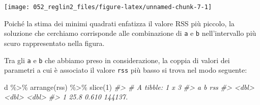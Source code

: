 \documentclass[
  10pt,
  italian,
  a4paper,
  extrafontsizes,onecolumn,openright
  ]{memoir}
\newenvironment{Shaded}{\begin{snugshade}}{\end{snugshade}}
\newcommand{\AttributeTok}[1]{\textcolor[rgb]{0.77,0.63,0.00}{#1}}
\newcommand{\CommentTok}[1]{\textcolor[rgb]{0.56,0.35,0.01}{\textit{#1}}}
\newcommand{\DecValTok}[1]{\textcolor[rgb]{0.00,0.00,0.81}{#1}}
\newcommand{\FloatTok}[1]{\textcolor[rgb]{0.00,0.00,0.81}{#1}}
\newcommand{\FunctionTok}[1]{\textcolor[rgb]{0.00,0.00,0.00}{#1}}
\newcommand{\NormalTok}[1]{#1}
\newcommand{\OtherTok}[1]{\textcolor[rgb]{0.56,0.35,0.01}{#1}}
\newcommand{\SpecialCharTok}[1]{\textcolor[rgb]{0.00,0.00,0.00}{#1}}
\newcommand{\StringTok}[1]{\textcolor[rgb]{0.31,0.60,0.02}{#1}}
\begin{document}
\begin{Shaded}
\end{Shaded}

\begin{center}\texttt{[image: 052\_reglin2\_files/figure-latex/unnamed-chunk-7-1]} \end{center}

Poiché la stima dei minimi quadrati enfatizza il valore RSS più piccolo, la soluzione che cerchiamo corrisponde alle combinazione di \texttt{a} e \texttt{b} nell'intervallo più scuro rappresentato nella figura.

Tra gli \texttt{a} e \texttt{b} che abbiamo preso in considerazione, la coppia di valori dei parametri a cui è associato il valore \texttt{rss} più basso si trova nel modo seguente:

\begin{Shaded}
\begin{Highlighting}[]
\NormalTok{d }\SpecialCharTok{\%\textgreater{}\%} 
  \FunctionTok{arrange}\NormalTok{(rss) }\SpecialCharTok{\%\textgreater{}\%} 
  \FunctionTok{slice}\NormalTok{(}\DecValTok{1}\NormalTok{)}
\CommentTok{\#\textgreater{} \# A tibble: 1 x 3}
\CommentTok{\#\textgreater{}       a     b     rss}
\CommentTok{\#\textgreater{}   \textless{}dbl\textgreater{} \textless{}dbl\textgreater{}   \textless{}dbl\textgreater{}}
\CommentTok{\#\textgreater{} 1  25.8 0.610 144137.}
\end{Highlighting}
\end{Shaded}
\end{document}
